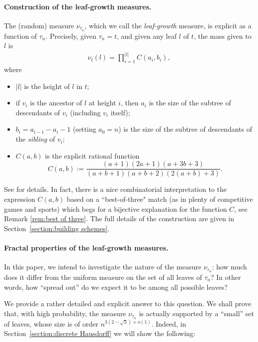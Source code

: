 \documentclass[11pt]{article}
\begin{document}
\paragraph{Construction of the leaf-growth measures.}

The (random) measure $\nu_{\tau_n}$, which we call the  \emph{leaf-growth} measure, is explicit as a function of $\tau_n$. Precisely, given $\tau_n=t$, and given any leaf $l$ of $t$, the mass given to $l$ is 
\begin{eqnarray} \label{eq:nunavecproduct}\nu_t(l)=\prod_{i=1}^{|l|}C(a_i,b_i), \end{eqnarray} 
where
\begin{itemize}
    \item $|l|$ is the height of $l$ in $t$;
    \item if $v_i$ is the ancestor of $l$ at height $i$, then $a_i$ is the size of the subtree of descendants of $v_i$ (including $v_i$ itself);
    \item $b_i=a_{i-1}-a_{i}-1$ (setting $a_0=n$) is the size of the subtree of descendants of the \emph{sibling} of $v_i$;
    \item $C(a,b)$ is the explicit rational function $$C(a,b) := \frac{(a+1)(2a+1)(a+3b+3)}{(a+b+1)(a+b+2)(2(a+b)+3)}.$$
\end{itemize}
See \cite{CS20} for details. In fact, there is a nice combinatorial interpretation to the expression $C(a,b)$ based on a ``best-of-three" match (as in plenty of competitive games and sports) which begs for a bijective explanation for the function $C$, see Remark \ref{rem:best of three}. 
The full details of the construction are given in Section~\ref{section:building schemes}.

\paragraph{Fractal properties of the leaf-growth measures.}
In this paper, we intend to investigate the nature of the measure $\nu_{\tau_n}$: how much does it differ from the uniform measure on the set of all leaves of $\tau_n$? In other words, how ``spread out'' do we expect it to be among all possible leaves?

We provide a rather detailed and explicit answer to this question. We shall prove that, with high probability, the measure $\nu_{\tau_n}$ is actually supported by a ``small'' set of leaves, whose size is of order $n^{3(2-\sqrt{3}) +o(1)}$. Indeed, in Section~\ref{section:discrete Hausdorff} we will show the following: 
\end{document}
